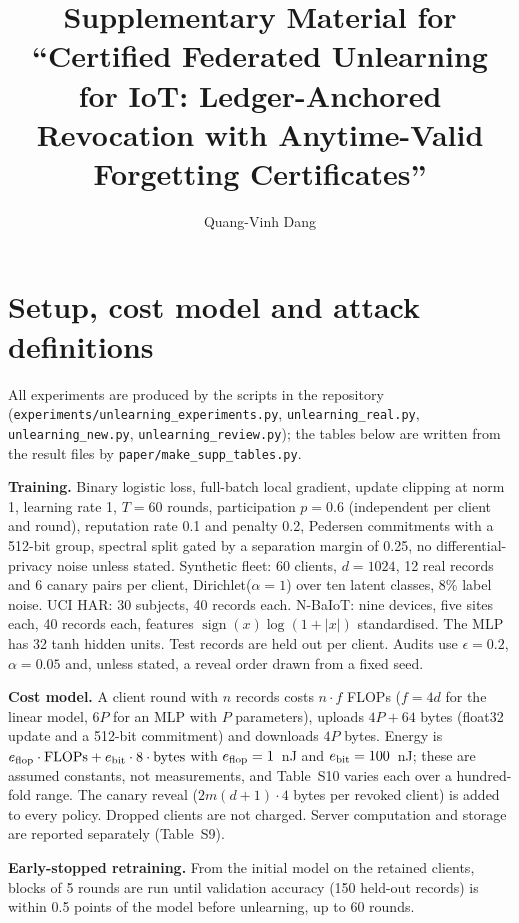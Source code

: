 \documentclass[journal]{IEEEtran}
\begin{document}
\title{Supplementary Material for\\ ``Certified Federated Unlearning for IoT: Ledger-Anchored Revocation with Anytime-Valid Forgetting Certificates''}
\author{Quang-Vinh Dang}
\maketitle

\section{Setup, cost model and attack definitions}
All experiments are produced by the scripts in the repository (\texttt{experiments/unlearning\_experiments.py}, \texttt{unlearning\_real.py}, \texttt{unlearning\_new.py}, \texttt{unlearning\_review.py}); the tables below are written from the result files by \texttt{paper/make\_supp\_tables.py}.

\textbf{Training.} Binary logistic loss, full-batch local gradient, update clipping at norm 1, learning rate 1, $T=60$ rounds, participation $p=0.6$ (independent per client and round), reputation rate 0.1 and penalty 0.2, Pedersen commitments with a 512-bit group, spectral split gated by a separation margin of 0.25, no differential-privacy noise unless stated. Synthetic fleet: 60 clients, $d=1024$, 12 real records and 6 canary pairs per client, Dirichlet($\alpha{=}1$) over ten latent classes, 8\% label noise. UCI HAR: 30 subjects, 40 records each. N-BaIoT: nine devices, five sites each, 40 records each, features $\operatorname{sign}(x)\log(1+|x|)$ standardised. The MLP has 32 tanh hidden units. Test records are held out per client. Audits use $\epsilon=0.2$, $\alpha=0.05$ and, unless stated, a reveal order drawn from a fixed seed.

\textbf{Cost model.} A client round with $n$ records costs $n\cdot f$ FLOPs ($f=4d$ for the linear model, $6P$ for an MLP with $P$ parameters), uploads $4P+64$ bytes (float32 update and a 512-bit commitment) and downloads $4P$ bytes. Energy is $e_{\rm flop}\cdot\text{FLOPs}+e_{\rm bit}\cdot 8\cdot\text{bytes}$ with $e_{\rm flop}=1$~nJ and $e_{\rm bit}=100$~nJ; these are assumed constants, not measurements, and Table~S10 varies each over a hundred-fold range. The canary reveal ($2m(d{+}1)\cdot4$ bytes per revoked client) is added to every policy. Dropped clients are not charged. Server computation and storage are reported separately (Table~S9).

\textbf{Early-stopped retraining.} From the initial model on the retained clients, blocks of 5 rounds are run until validation accuracy (150 held-out records) is within 0.5 points of the model before unlearning, up to 60 rounds.
\end{document}

